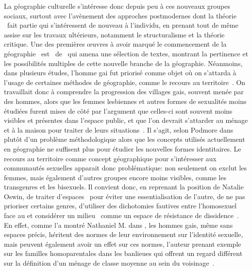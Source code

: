 La géographie culturelle s'intéresse donc depuis peu à ces nouveaux groupes sociaux, surtout avec l'avènement des approches postmodernes dont la théorie \qu\ fait partie qui s'intéressent de nouveau à l'individu, en prenant tout de même assise sur les travaux ultérieurs, notamment le structuralisme et la théorie critique. 
Une des premières œuvres à avoir marqué le commencement de la géographie \qu\ est~ de~\citet{Bell1994} qui amena une sélection de textes, montrant la pertinence et les possibilités multiples de cette nouvelle branche de la géographie. 
Néanmoins, dans plusieurs études, l'homme gai fut priorisé comme objet où on s'attarda à l'usage de certaines méthodes de géographie, comme le recours au territoire~\citep{Podmore2001,Oswin2008}. 
On travaillait donc à comprendre la progression des villages gais, souvent menée par des hommes, alors que les femmes lesbiennes et autres formes de sexualités moins étudiées furent mises de côté par l'argument que celles-ci sont souvent moins visibles et présentes dans l'espace public, et que l'on devrait s'attarder au ménage et à la maison pour traiter de leurs situations~\citep[333-334]{Podmore2001}. 
Il s'agit, selon Podmore dans  plutôt d'un problème méthodologique alors que les concepts utilisés actuellement en géographie ne suffisent plus pour étudier les nouvelles formes identitaires. 
Le recours au territoire comme concept géographique pour s'intéresser aux communautés sexuelles apparait donc problématique: non seulement on exclut les femmes, mais également d'autres groupes encore moins visibles, comme les transgenres et les bisexuels. 
Il convient donc, en reprenant la position de Natalie Oswin, de traiter d'espaces \qus\ pour éviter une essentialisation de l'autre, de ne pas prioriser certains genres, d'utiliser des dichotomies fautives entre l'homosexuel face au  et considérer  un milieu \qu\ comme un espace de résistance de dissidence~\citep{Oswin2008}. 
En effet, comme l'a montré Nathaniel M. \citet{Lewis2011} dans , les hommes gais, même sans espaces précis, héritent des normes de leur environnement sur l'identité sexuelle, mais peuvent également avoir un effet sur ces normes, l'auteur prenant exemple sur les familles homoparentales dans les banlieues qui offrent un regard différent sur la définition d'un ménage de classe moyenne au sein du voisinage~\citep[304]{Lewis2011}.

